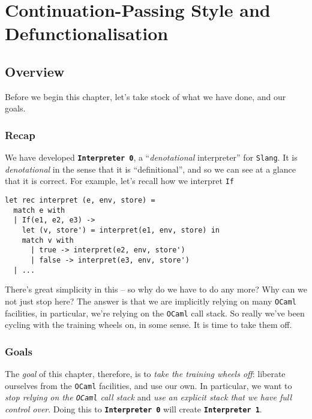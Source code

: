 \chapter{Continuation-Passing Style and Defunctionalisation}



\section{Overview}
Before we begin this chapter, let's take stock of what we have done, and our goals. 

\subsection{Recap}
We have developed \textbf{\texttt{Interpreter 0}}, a ``\emph{denotational} interpreter'' for \texttt{Slang}. It is \emph{denotational} in the sense that it is ``definitional'', and so we can see at a glance that it is correct. For example, let's recall how we interpret \texttt{If}

\begin{code}
\begin{verbatim}
let rec interpret (e, env, store) =
  match e with
  | If(e1, e2, e3) -> 
    let (v, store') = interpret(e1, env, store) in
    match v with 
      | true -> interpret(e2, env, store')
      | false -> interpret(e3, env, store')
  | ...
\end{verbatim}
\end{code}

There's great simplicity in this -- so why do we have to do any more? Why can we not just stop here? The answer is that we are implicitly relying on many \texttt{OCaml} facilities, in particular, we're relying on the \texttt{OCaml} call stack. So really we've been cycling with the training wheels on, in some sense. It is time to take them off. 

\subsection{Goals}
The \emph{goal} of this chapter, therefore, is to \emph{take the training wheels off}: liberate ourselves from the \texttt{OCaml} facilities, and use our own. In particular, we want to \emph{stop relying on the \texttt{OCaml} call stack} and \emph{use an explicit stack that we have full control over}. Doing this to \textbf{\texttt{Interpreter 0}} will create \textbf{\texttt{Interpreter 1}}.

